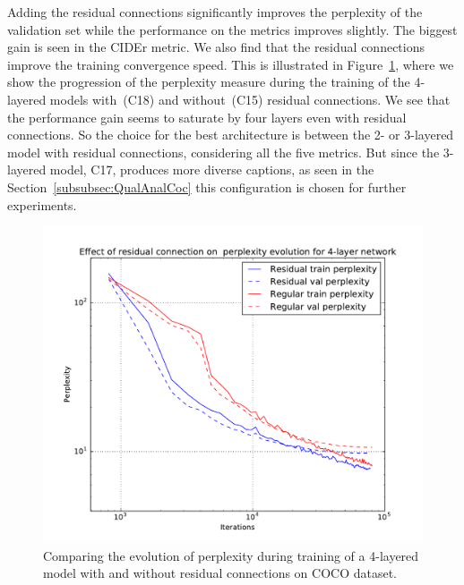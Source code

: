 Adding the residual connections significantly improves the perplexity of the
validation set while the performance on the metrics improves slightly.
The biggest gain is seen in the CIDEr metric.
We also find that the residual connections improve the training convergence speed.
This is illustrated in Figure~\ref{fig:ResVsReg}, where we show the
progression of the perplexity measure during the training of the 4-layered models
with~(C18) and without~(C15) residual connections.
We see that the performance gain seems to saturate by four layers even with residual
connections.
So the choice for the best architecture is between the 2- or 3-layered model with
residual connections, considering all the five metrics.
But since the 3-layered model, C17, produces more diverse captions, as seen in
the Section~\ref{subsubsec:QualAnalCoc} this configuration is chosen for further
experiments.
\begin{figure}[t]
\begin{center}
  \includegraphics[width=0.7\linewidth]{images/ResidualVsRegPerplex.pdf}
\end{center}
\vspace*{-10mm}
\caption{Comparing the evolution of perplexity during training of a 4-layered
        model with and without residual connections on COCO dataset.}
\label{fig:ResVsReg}
\end{figure}

